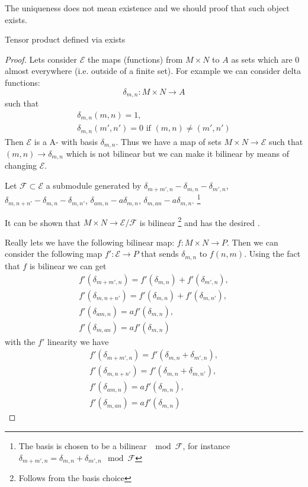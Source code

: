 The uniqueness does not mean existence and we should proof that such
object exists.
\begin{lemma}
  Tensor product defined via  exists
  \begin{proof}
    Lets consider $\mathcal{E}$ the maps (functions) from
    $M \times N$ to $A$ as sets which are $0$ almost everywhere
    (i.e. outside of a finite set). For example we can consider delta
    functions:
    \[
    \delta_{m,n} : M \times N \to A
    \]
    such that
    \begin{eqnarray}
      \delta_{m,n}(m,n) = 1,
      \nonumber \\
      \delta_{m,n}(m',n') = 0 \mbox{ if } (m,n) \ne (m',n')
      \nonumber 
    \end{eqnarray}
    Then $\mathcal{E}$ is a A- with basis
    $\delta_{m,n}$. Thus we have a map of sets $M \times N \to
    \mathcal{E}$ such that $(m,n) \to \delta_{m,n}$ which is not bilinear
    but we can make it bilinear by means of changing $\mathcal{E}$.
    
    Let $\mathcal{F} \subset \mathcal{E}$ a submodule generated by
    $\delta_{m+m',n} - \delta_{m,n} - \delta_{m',n}$,
    $\delta_{m,n+n'} - \delta_{m,n} - \delta_{m,n'}$,
    $\delta_{am,n} - a\delta_{m,n}$,
    $\delta_{m,an} - a\delta_{m,n}$.
    \footnote{
      The basis is chosen to be a bilinear $\mod \mathcal{F}$, for instance
      $\delta_{m+m',n} = \delta_{m,n} + \delta_{m',n} \mod \mathcal{F}$
    }
    
    It can be shown that $M \times N \to \mathcal{E}/\mathcal{F}$ is
    bilinear
    \footnote{
      Follows from the basis choice
    }
    and has the desired .

    Really lets we have the following bilinear map:
    $f: M \times N \to P$. Then we can consider the following map
    $f': \mathcal{E} \to P$ that sends $\delta_{m,n}$ to
    $f(n,m)$. Using the fact that $f$ is bilinear we can get
    \begin{eqnarray}
      f'(\delta_{m+m',n}) = f'(\delta_{m,n}) + f'(\delta_{m',n}),
      \nonumber \\
      f'(\delta_{m,n+n'}) = f'(\delta_{m,n}) + f'(\delta_{m,n'}),
      \nonumber \\
      f'(\delta_{am,n}) =  a f'(\delta_{m,n}),
      \nonumber \\
      f'(\delta_{m,an}) = a f'(\delta_{m,n})
      \nonumber
    \end{eqnarray}
    with the $f'$ linearity we have
    \begin{eqnarray}
      f'(\delta_{m+m',n}) = f'(\delta_{m,n} + \delta_{m',n}),
      \nonumber \\
      f'(\delta_{m,n+n'}) = f'(\delta_{m,n} + \delta_{m,n'}),
      \nonumber \\
      f'(\delta_{am,n}) =  a f'(\delta_{m,n}),
      \nonumber \\
      f'(\delta_{m,an}) = a f'(\delta_{m,n})
      \nonumber
    \end{eqnarray}


\end{proof}
\end{lemma}
